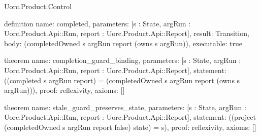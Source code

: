 \begin{lexlean}{Uorc.Product.Control}
\begin{semanticmodule}
definition{
  name: completed,
  parameters: [s : State, argRun : Uorc.Product.Api::Run, report : Uorc.Product.Api::Report],
  result: Transition,
  body: (completedOwned s argRun report (owns s argRun)),
  executable: true
}

theorem{
  name: completion_guard_binding,
  parameters: [s : State, argRun : Uorc.Product.Api::Run, report : Uorc.Product.Api::Report],
  statement: ((completed s argRun report) = (completedOwned s argRun report (owns s argRun))),
  proof: reflexivity{},
  axioms: []
}

theorem{
  name: stale_guard_preserves_state,
  parameters: [s : State, argRun : Uorc.Product.Api::Run, report : Uorc.Product.Api::Report],
  statement: ((project (completedOwned s argRun report false) state) = s),
  proof: reflexivity{},
  axioms: []
}


\end{semanticmodule}
\end{lexlean}
